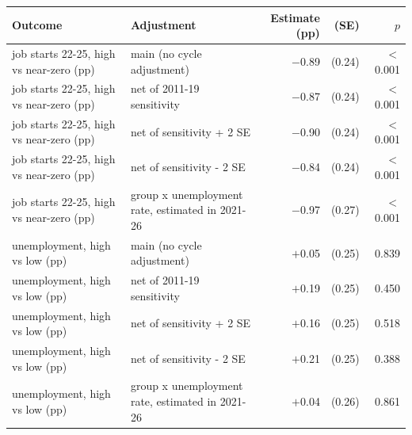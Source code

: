 \begin{tabular}{llrrr}
\toprule
Outcome & Adjustment & Estimate (pp) & (SE) & $p$ \\
\midrule
job starts 22-25, high vs near-zero (pp) & main (no cycle adjustment) & \ensuremath{-}0.89 & (0.24) & $<$0.001 \\
job starts 22-25, high vs near-zero (pp) & net of 2011-19 sensitivity & \ensuremath{-}0.87 & (0.24) & $<$0.001 \\
job starts 22-25, high vs near-zero (pp) & net of sensitivity + 2 SE & \ensuremath{-}0.90 & (0.24) & $<$0.001 \\
job starts 22-25, high vs near-zero (pp) & net of sensitivity - 2 SE & \ensuremath{-}0.84 & (0.24) & $<$0.001 \\
job starts 22-25, high vs near-zero (pp) & group x unemployment rate, estimated in 2021-26 & \ensuremath{-}0.97 & (0.27) & $<$0.001 \\
unemployment, high vs low (pp) & main (no cycle adjustment) & \ensuremath{+}0.05 & (0.25) & 0.839 \\
unemployment, high vs low (pp) & net of 2011-19 sensitivity & \ensuremath{+}0.19 & (0.25) & 0.450 \\
unemployment, high vs low (pp) & net of sensitivity + 2 SE & \ensuremath{+}0.16 & (0.25) & 0.518 \\
unemployment, high vs low (pp) & net of sensitivity - 2 SE & \ensuremath{+}0.21 & (0.25) & 0.388 \\
unemployment, high vs low (pp) & group x unemployment rate, estimated in 2021-26 & \ensuremath{+}0.04 & (0.26) & 0.861 \\
\bottomrule
\end{tabular}
